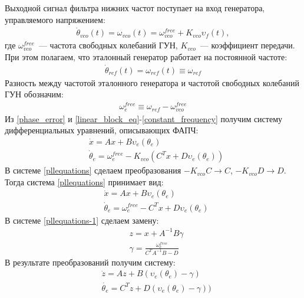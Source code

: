 \documentclass[a4paper,article,14pt]{extarticle}
\begin{document}
Выходной сигнал фильтра нижних частот поступает на вход генератора, управляемого напряжением:
 \begin{equation}\label{VCO_eq}
 \begin{aligned}
\dot{\theta}_{vco}(t) = \omega_{vco}(t) = \omega^{free}_{vco} + K_{vco}\upsilon_f(t),
 \end{aligned}
\end{equation}
где $\omega^{free}_{vco}$~--- частота свободных колебаний ГУН, $K_{vco}$~--- коэффициент передачи. При этом полагаем, что эталонный генератор работает на постоянной частоте:
 \begin{equation}
 \begin{aligned}
\dot{\theta}_{ref}(t) = \omega_{ref}(t) \equiv \omega_{ref}
 \end{aligned}
\end{equation}
Разность между частотой эталонного генератора и частотой свободных колебаний ГУН обозначим:
 \begin{equation}\label{constant_frequency}
 \begin{aligned}
\omega_e^{free} \equiv \omega_{ref} - \omega^{free}_{vco}
 \end{aligned}
\end{equation}
Из \eqref{phase_error} и \eqref{linear_block_eq}-\eqref{constant_frequency} получим систему дифференциальных уравнений, описывающих ФАПЧ:
 \begin{equation}\label{pllequations}
 \begin{aligned}
 &\dot{x} = Ax + B\upsilon_e(\theta_e)\\
 &\dot{\theta}_e = \omega_e^{free} - K_{vco}(C^Tx + D\upsilon_e(\theta_e))
 \end{aligned}
\end{equation}
В системе \eqref{pllequations} сделаем преобразования $-K_{vco}C \rightarrow C$, $-K_{vco}D \rightarrow D$. Тогда система \eqref{pllequations} принимает вид:
 \begin{equation}\label{pllequations-1}
 \begin{aligned}
 &\dot{x} = Ax + B\upsilon_e(\theta_e)\\
 &\dot{\theta}_e = \omega_e^{free} - C^Tx + D\upsilon_e(\theta_e)
 \end{aligned}
\end{equation}
В системе \eqref{pllequations-1} сделаем замену:
 \begin{equation}
 \begin{aligned}
 &z = x + A^{-1}B\gamma \\
 &\gamma = \frac{\omega_e^{free}}{C^TA^{-1}B-D}
 \end{aligned}
\end{equation}
В результате преобразований получим систему:
 \begin{equation}\label{system_pll}
 \begin{aligned}
 &\dot{z} = Az + B(\upsilon_e(\theta_e) - \gamma)\\
 &\dot{\theta_e} = C^Tz + D(\upsilon_e(\theta_e) - \gamma))
 \end{aligned}
\end{equation}
\end{document}
